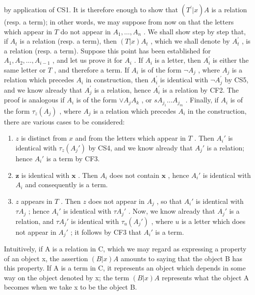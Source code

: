 by application of CS1. It is therefore enough to show that \((T^{\prime}|x)A\) is a relation (resp. a term); in other words, we may suppose from now on that the letters which appear in \(T\) do not appear in \(A_{1},\ldots ,A_{n}\) . We shall show step by step that, if \(A_{t}\) is a relation (resp. a term), then \((T|x)A_{t}\) , which we shall denote by \(A_{t}^{\prime}\) , is a relation (resp. a term). Suppose this point has been established for \(A_{1},A_{2},\ldots ,A_{i - 1}\) , and let us prove it for \(A_{i}\) . If \(A_{i}\) is a letter, then \(A_{i}^{\prime}\) is either the same letter or \(T\) , and therefore a term. If \(A_{i}\) is of the form \(\lnot A_j\) , where \(A_{j}\) is a relation which precedes \(A_{i}\) in construction, then \(A_{i}^{\prime}\) is identical with \(\lnot A_j^{\prime}\) by CS5, and we know already that \(A_{j}^{\prime}\) is a relation, hence \(A_{i}^{\prime}\) is a relation by CF2. The proof is analogous if \(A_{i}\) is of the form \(\vee A_{j}A_{k}\) , or \(sA_{j_1}\ldots A_{j_m}\) . Finally, if \(A_{i}\) is of the form \(\tau_{z}(A_j)\) , where \(A_{j}\) is a relation which precedes \(A_{i}\) in the construction, there are various cases to be considered:

\begin{enumerate}
\def\labelenumi{(\alph{enumi})}
\item
  \(z\) is distinct from \(x\) and from the letters which appear in \(T\) . Then \(A_i'\) is identical with \(\tau_z(A_j')\) by CS4, and we know already that \(A_j'\) is a relation; hence \(A_i'\) is a term by CF3.
\item
  \(\pmb{z}\) is identical with \(\pmb{x}\) . Then \(A_{i}\) does not contain \(\pmb{x}\) , hence \(A_{i}'\) is identical with \(A_{i}\) and consequently is a term.
\item
  \(z\) appears in \(T\) . Then \(z\) does not appear in \(A_j\) , so that \(A_i'\) is identical with \(\tau A_j\) ; hence \(A_i'\) is identical with \(\tau A_j'\) . Now, we know already that \(A_j'\) is a relation, and \(\tau A_j'\) is identical with \(\tau_u(A_j')\) , where \(u\) is a letter which does not appear in \(A_j'\) ; it follows by CF3 that \(A_i'\) is a term.
\end{enumerate}

Intuitively, if A is a relation in C, which we may regard as expressing a property of an object x, the assertion \((B|x)A\) amounts to saying that the object B has this property. If A is a term in C, it represents an object which depends in some way on the object denoted by x; the term \((B|x)A\) represents what the object A becomes when we take x to be the object B.

